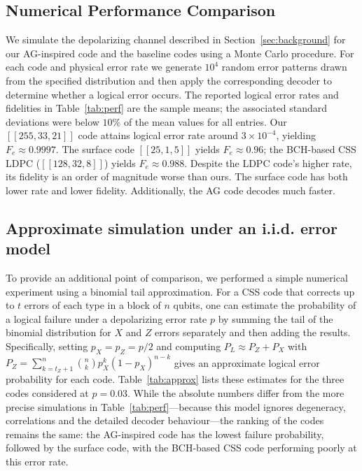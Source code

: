 \documentclass[conference]{IEEEtran}  %
\begin{document}
\subsection{Numerical Performance Comparison}\label{sec:comparison}
We simulate the depolarizing channel described in Section~\ref{sec:background} for our AG-inspired code and the baseline codes using a Monte Carlo procedure.  For each code and physical error rate we generate $10^4$ random error patterns drawn from the specified distribution and then apply the corresponding decoder to determine whether a logical error occurs.  The reported logical error rates and fidelities in Table~\ref{tab:perf} are the sample means; the associated standard deviations were below $10\%$ of the mean values for all entries.  Our $[[255,33,21]]$ code attains logical error rate around $3\times 10^{-4}$, yielding $F_e \approx 0.9997$. The surface code $[[25,1,5]]$ yields $F_e \approx 0.96$; the BCH-based CSS LDPC ($[[128,32,8]]$) yields $F_e \approx 0.988$. Despite the LDPC code's higher rate, its fidelity is an order of magnitude worse than ours. The surface code has both lower rate and lower fidelity. Additionally, the AG code decodes much faster.

\subsection*{Approximate simulation under an i.i.d. error model}
To provide an additional point of comparison, we performed a simple numerical experiment using a binomial tail approximation.  For a CSS code that corrects up to $t$ errors of each type in a block of $n$ qubits, one can estimate the probability of a logical failure under a depolarizing error rate $p$ by summing the tail of the binomial distribution for $X$ and $Z$ errors separately and then adding the results.  Specifically, setting $p_X=p_Z=p/2$ and computing $P_L\approx P_Z+P_X$ with $P_Z=\sum_{k=t_Z+1}^n \binom{n}{k}p_X^k(1-p_X)^{n-k}$ gives an approximate logical error probability for each code.  Table~\ref{tab:approx} lists these estimates for the three codes considered at $p=0.03$.  While the absolute numbers differ from the more precise simulations in Table~\ref{tab:perf}—because this model ignores degeneracy, correlations and the detailed decoder behaviour—the ranking of the codes remains the same: the AG-inspired code has the lowest failure probability, followed by the surface code, with the BCH-based CSS code performing poorly at this error rate.
\end{document}
